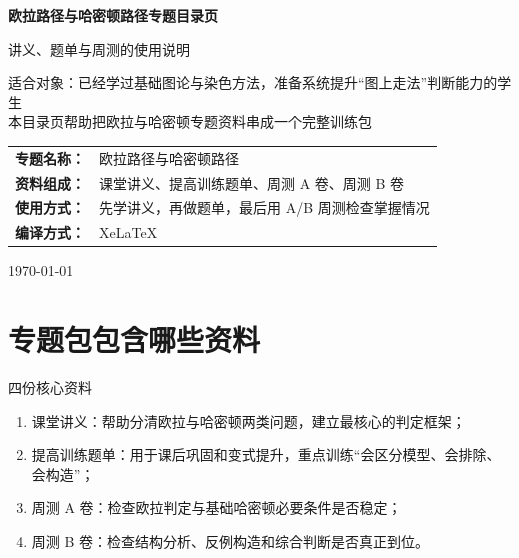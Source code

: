 \documentclass[11pt,a4paper,fontset=fandol]{ctexart}
\begin{document}
\thispagestyle{empty}
\begin{titlepage}
\centering
\vspace*{0.9cm}

\begin{tcolorbox}[enhanced,width=0.92\textwidth,colback=white,colframe=mainblue,boxrule=1pt,arc=0mm,left=6mm,right=6mm,top=8mm,bottom=8mm]
\centering

{\fontsize{24}{30}\selectfont\bfseries 欧拉路径与哈密顿路径专题目录页\par}
\vspace{0.65cm}
{\fontsize{17}{22}\selectfont 讲义、题单与周测的使用说明\par}

\vspace{1cm}
\begin{tcolorbox}[colback=lightblue,colframe=mainblue,width=0.84\textwidth,boxrule=1pt]
\centering
{\large 适合对象：已经学过基础图论与染色方法，准备系统提升“图上走法”判断能力的学生}\\[0.35em]
{\normalsize 本目录页帮助把欧拉与哈密顿专题资料串成一个完整训练包}
\end{tcolorbox}

\vspace{1.0cm}
\renewcommand{\arraystretch}{1.42}
\begin{tabular}{>{\bfseries}p{3.5cm}p{8cm}}
专题名称： & 欧拉路径与哈密顿路径 \\
资料组成： & 课堂讲义、提高训练题单、周测 A 卷、周测 B 卷 \\
使用方式： & 先学讲义，再做题单，最后用 A/B 周测检查掌握情况 \\
编译方式： & XeLaTeX \\
\end{tabular}

\vspace{0.9cm}
{\large \today\par}
\end{tcolorbox}
\end{titlepage}

\tableofcontents
\newpage

\section{专题包包含哪些资料}

\begin{goalbox}{四份核心资料}
\begin{enumerate}
  \item 课堂讲义：帮助分清欧拉与哈密顿两类问题，建立最核心的判定框架；
  \item 提高训练题单：用于课后巩固和变式提升，重点训练“会区分模型、会排除、会构造”；
  \item 周测 A 卷：检查欧拉判定与基础哈密顿必要条件是否稳定；
  \item 周测 B 卷：检查结构分析、反例构造和综合判断是否真正到位。
\end{enumerate}
\end{goalbox}
\end{document}
